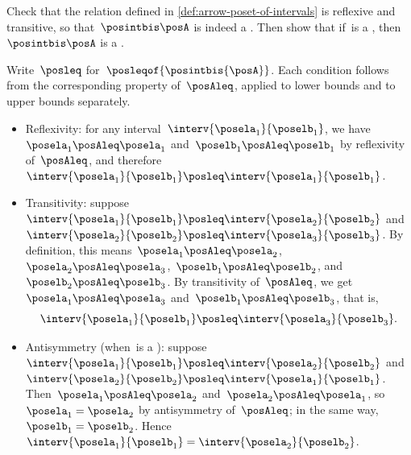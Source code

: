 \begin{exercise}
    Check that the relation defined in \cref{def:arrow-poset-of-intervals} is reflexive and transitive, so that~$\posintbis\posA$ is indeed a .
    Then show that if~\posA is a , then~$\posintbis\posA$ is a .
\end{exercise}
\begin{solution}
    Write~$\posleq$ for~$\posleqof{\posintbis{\posA}}$.
    Each condition follows from the corresponding property of~$\posAleq$, applied to lower bounds and to upper bounds separately.
    \begin{itemize}
        \item Reflexivity: for any interval~$\interv{\posela_1}{\poselb_1}$, we have~$\posela_1\posAleq \posela_1$ and~$\poselb_1\posAleq \poselb_1$ by reflexivity of~$\posAleq$, and therefore~$\interv{\posela_1}{\poselb_1} \posleq \interv{\posela_1}{\poselb_1}$.
        \item Transitivity: suppose~$\interv{\posela_1}{\poselb_1} \posleq \interv{\posela_2}{\poselb_2}$ and~$\interv{\posela_2}{\poselb_2} \posleq \interv{\posela_3}{\poselb_3}$.
              By definition, this means~$\posela_1 \posAleq \posela_2$,~$\posela_2 \posAleq \posela_3$,~$\poselb_1 \posAleq \poselb_2$, and~$\poselb_2 \posAleq \poselb_3$.
              By transitivity of~$\posAleq$, we get~$\posela_1 \posAleq \posela_3$ and~$\poselb_1 \posAleq \poselb_3$, that is,
              \begin{equation}
                  \interv{\posela_1}{\poselb_1} \posleq \interv{\posela_3}{\poselb_3}.
              \end{equation}
        \item Antisymmetry (when~\posA is a ): suppose~$\interv{\posela_1}{\poselb_1} \posleq \interv{\posela_2}{\poselb_2}$ and~$\interv{\posela_2}{\poselb_2} \posleq \interv{\posela_1}{\poselb_1}$.
              Then~$\posela_1 \posAleq \posela_2$ and~$\posela_2 \posAleq \posela_1$, so~$\posela_1=\posela_2$ by antisymmetry of~$\posAleq$; in the same way,~$\poselb_1=\poselb_2$.
              Hence~$\interv{\posela_1}{\poselb_1} = \interv{\posela_2}{\poselb_2}$.
    \end{itemize}
\end{solution}

